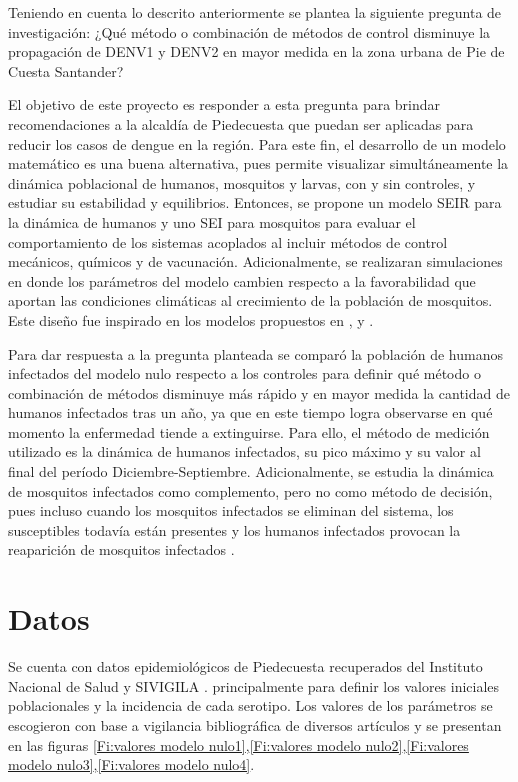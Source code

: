 \documentclass[journal]{IEEEtran}
\begin{document}
Teniendo en cuenta lo descrito anteriormente se plantea la siguiente pregunta de investigación:
¿Qué método o combinación de métodos de control disminuye la propagación de  DENV1 y DENV2 en mayor medida en la zona urbana de Pie de Cuesta Santander?

El objetivo de este proyecto es responder a esta pregunta para brindar recomendaciones a la alcaldía de Piedecuesta que puedan ser aplicadas para reducir los casos de dengue en la región. Para este fin, el desarrollo de un modelo matemático es una buena alternativa, pues permite visualizar simultáneamente la dinámica poblacional de humanos, mosquitos y larvas, con y sin controles, y estudiar su estabilidad y equilibrios. Entonces, se propone un modelo SEIR para la dinámica de humanos y uno SEI para mosquitos para evaluar el comportamiento de los sistemas acoplados al incluir métodos de control mecánicos, químicos y de vacunación. Adicionalmente, se realizaran simulaciones en donde los parámetros del modelo cambien respecto a la favorabilidad que aportan las condiciones climáticas al crecimiento de la población de mosquitos. Este diseño fue inspirado en los modelos propuestos en \cite{carvalho2019mathematical}, \cite{Maidana_Yang_2008} y \cite{janreung_chinviriyasit_chinviriyasit_2020}.

Para dar respuesta a la pregunta planteada se comparó la población de humanos infectados del modelo nulo respecto a los controles para definir qué método o combinación de métodos disminuye más rápido y en mayor medida la cantidad de humanos infectados tras un año, ya que en este tiempo logra observarse en qué momento la enfermedad tiende a extinguirse. Para ello, el método de medición utilizado es la dinámica de humanos infectados, su pico máximo y su valor al final del período Diciembre-Septiembre. Adicionalmente, se estudia la dinámica de mosquitos infectados como complemento, pero no como método de decisión, pues incluso cuando los mosquitos infectados se eliminan del sistema, los susceptibles todavía están presentes y los humanos infectados provocan la reaparición de mosquitos infectados \cite{carvalho2019mathematical}. %


\section{Datos}

Se cuenta con datos epidemiológicos de Piedecuesta recuperados del Instituto Nacional de Salud y SIVIGILA \cite{insti,article1}. principalmente para definir los valores iniciales poblacionales y la incidencia de cada serotipo. Los valores de los parámetros se escogieron con base a vigilancia bibliográfica de diversos artículos y se presentan en las figuras \ref{Fi:valores modelo nulo1},\ref{Fi:valores modelo nulo2},\ref{Fi:valores modelo nulo3},\ref{Fi:valores modelo nulo4}.
\end{document}
